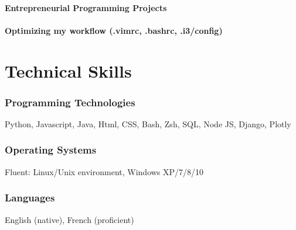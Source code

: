 \documentclass{article}
\begin{document}
\paragraph{Entrepreneurial Programming Projects}

\paragraph{Optimizing my workflow (.vimrc, .bashrc, .i3/config)}


\section{Technical Skills}

\subsubsection{Programming Technologies}
\hfill Python, Javascript, Java, Html, CSS, Bash, Zsh, SQL, Node JS, Django, Plotly

\subsubsection{Operating Systems}
\hfill Fluent: Linux/Unix environment, Windows XP/7/8/10

\subsubsection{Languages}
\hfill English (native), French (proficient)
\end{document}
